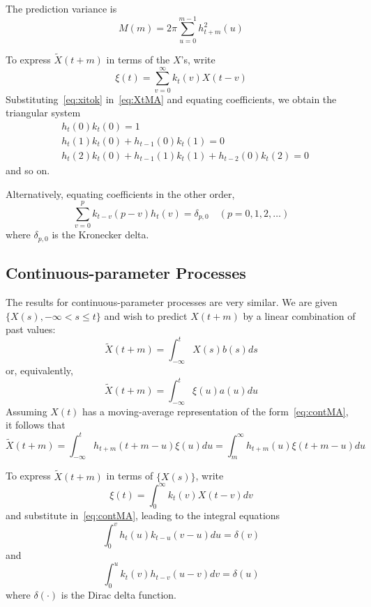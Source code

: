 \documentclass[11pt]{article}
\begin{document}
The prediction variance is
\begin{equation}
M(m) = 2\pi \sum_{u=0}^{m-1} h_{t+m}^2(u)
\label{eq:predvar2}
\end{equation}

To express $\tilde{X}(t+m)$ in terms of the $X$'s, write
\begin{equation}
\xi(t) = \sum_{v=0}^{\infty} k_t(v) X(t-v)
\label{eq:xitok}
\end{equation}
Substituting~\eqref{eq:xitok} in~\eqref{eq:XtMA} and equating coefficients, we obtain the triangular system
\begin{align}
& h_t(0)k_t(0) = 1 \nonumber \\
& h_t(1)k_t(0) + h_{t-1}(0)k_t(1) = 0 \nonumber \\
& h_t(2)k_t(0) + h_{t-1}(1)k_t(1) + h_{t-2}(0)k_t(2) = 0 \label{eq:triangular}
\end{align}
and so on.

Alternatively, equating coefficients in the other order,
\begin{equation}
\sum_{v=0}^p k_{t-v}(p-v) h_t(v) = \delta_{p,0} \quad (p=0,1,2,\ldots)
\label{eq:triangular2}
\end{equation}
where $\delta_{p,0}$ is the Kronecker delta.

\subsection{Continuous-parameter Processes}

The results for continuous-parameter processes are very similar. We are given $\{X(s), -\infty < s \leq t\}$ and wish to predict $X(t+m)$ by a linear combination of past values:
\begin{equation}
\tilde{X}(t+m) = \int_{-\infty}^t X(s) b(s) ds
\label{eq:contpredX}
\end{equation}
or, equivalently,
\begin{equation}
\tilde{X}(t+m) = \int_{-\infty}^t \xi(u) a(u) du
\label{eq:contpredxi}
\end{equation}
Assuming $X(t)$ has a moving-average representation of the form~\eqref{eq:contMA}, it follows that
\begin{equation}
\tilde{X}(t+m) = \int_{-\infty}^t h_{t+m}(t+m-u) \xi(u) du = \int_m^{\infty} h_{t+m}(u) \xi(t+m-u) du
\label{eq:contpredsol}
\end{equation}

To express $\tilde{X}(t+m)$ in terms of $\{X(s)\}$, write
\begin{equation}
\xi(t) = \int_0^{\infty} k_t(v) X(t-v) dv
\label{eq:contxitok}
\end{equation}
and substitute in~\eqref{eq:contMA}, leading to the integral equations
\begin{equation}
\int_0^v h_t(u) k_{t-u}(v-u) du = \delta(v)
\label{eq:conttriangular}
\end{equation}
and
\begin{equation}
\int_0^u k_t(v) h_{t-v}(u-v) dv = \delta(u)
\label{eq:conttriangular2}
\end{equation}
where $\delta(\cdot)$ is the Dirac delta function.
\end{document}
